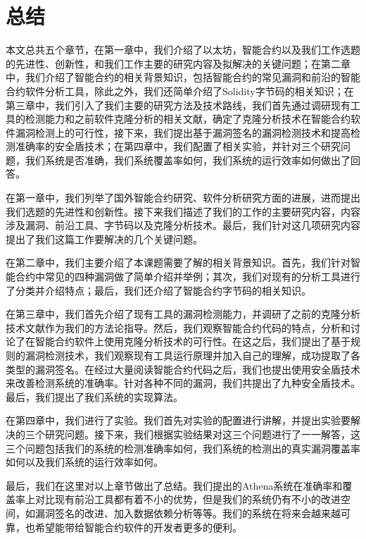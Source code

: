 \chapter{总结}

本文总共五个章节，在第一章中，我们介绍了以太坊，智能合约以及我们工作选题的先进性、创新性，和我们工作主要的研究内容及拟解决的关键问题；在第二章中，我们介绍了智能合约的相关背景知识，包括智能合约的常见漏洞和前沿的智能合约软件分析工具，除此之外，我们还简单介绍了Solidity字节码的相关知识；在第三章中，我们引入了我们主要的研究方法及技术路线，我们首先通过调研现有工具的检测能力和之前软件克隆分析的相关文献，确定了克隆分析技术在智能合约软件漏洞检测上的可行性，接下来，我们提出基于漏洞签名的漏洞检测技术和提高检测准确率的安全盾技术；在第四章中，我们配置了相关实验，并针对三个研究问题，我们系统是否准确，我们系统覆盖率如何，我们系统的运行效率如何做出了回答。

在第一章中，我们列举了国外智能合约研究、软件分析研究方面的进展，进而提出我们选题的先进性和创新性。接下来我们描述了我们的工作的主要研究内容，内容涉及漏洞、前沿工具、字节码以及克隆分析技术。最后，我们针对这几项研究内容提出了我们这篇工作要解决的几个关键问题。

在第二章中，我们主要介绍了本课题需要了解的相关背景知识。首先，我们针对智能合约中常见的四种漏洞做了简单介绍并举例；其次，我们对现有的分析工具进行了分类并介绍特点；最后，我们还介绍了智能合约字节码的相关知识。

在第三章中，我们首先介绍了现有工具的漏洞检测能力，并调研了之前的克隆分析技术文献作为我们的方法论指导。然后，我们观察智能合约代码的特点，分析和讨论了在智能合约软件上使用克隆分析技术的可行性。在这之后，我们提出了基于规则的漏洞检测技术，我们观察现有工具运行原理并加入自己的理解，成功提取了各类型的漏洞签名。在经过大量阅读智能合约代码之后，我们也提出使用安全盾技术来改善检测系统的准确率。针对各种不同的漏洞，我们共提出了九种安全盾技术。最后，我们提出了我们系统的实现算法。

在第四章中，我们进行了实验。我们首先对实验的配置进行讲解，并提出实验要解决的三个研究问题。接下来，我们根据实验结果对这三个问题进行了一一解答，这三个问题包括我们的系统的检测准确率如何，我们系统的检测出的真实漏洞覆盖率如何以及我们系统的运行效率如何。

最后，我们在这里对以上章节做出了总结。我们提出的Athena系统在准确率和覆盖率上对比现有前沿工具都有着不小的优势，但是我们的系统仍有不小的改进空间，如漏洞签名的改进、加入数据依赖分析等等。我们的系统在将来会越来越可靠，也希望能带给智能合约软件的开发者更多的便利。